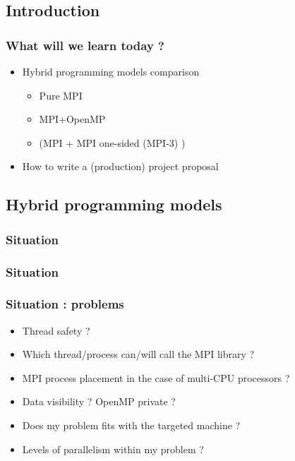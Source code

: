 \subsection{Introduction}

\begin{frame}[containsverbatim]
	\frametitle{What will we learn today ?}	
	\begin{itemize}
		\item {Hybrid programming models comparison
			\begin{itemize}
				\item {Pure MPI}
				\item {MPI+OpenMP}
				\item {(MPI + MPI one-sided (MPI-3) )}
			\end{itemize}
		}
		\item {How to write a (production) project proposal}
	\end{itemize}
\end{frame}


\subsection{Hybrid programming models}


\begin{frame}[containsverbatim]
	\frametitle{Situation}	

\hspace*{2mm}

\end{frame}



\begin{frame}[containsverbatim]
	\frametitle{Situation}	

\vspace*{2mm}

\end{frame}

\begin{frame}[containsverbatim]
	\frametitle{Situation : problems}	
\begin{itemize}
	\item {Thread safety ?}
	\item {Which thread/process can/will call the MPI library ?}
	\item {MPI process placement in the case of multi-CPU processors ?}
	\item {Data visibility ? OpenMP private ? }
	\item {Does my problem fits with the targeted machine ?}
	\item {Levels of parallelism within my problem ?}
\end{itemize}
\end{frame}



